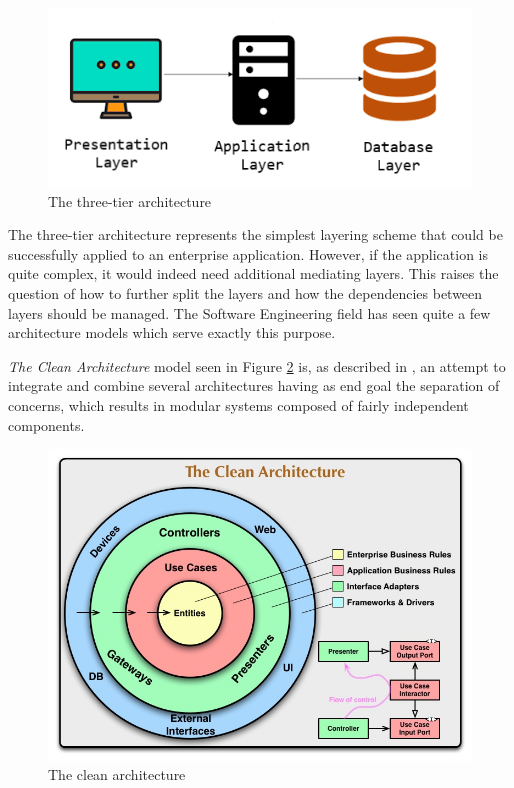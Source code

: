 \begin{figure}[H]
  \centering
  \includegraphics[width=5in]{images/threeTierArchitecture}
  \caption{The three-tier architecture}
  \label{threeTierArchitecture}
\end{figure}

The three-tier architecture represents the simplest layering scheme that could be successfully applied to an enterprise application. However, if the application is quite complex, it would indeed need additional mediating layers. This raises the question of how to further split the layers and how the dependencies between layers should be managed. The Software Engineering field has seen quite a few architecture models which serve exactly this purpose.

\textit{The Clean Architecture} model seen in Figure \ref{cleanArchitectureImg} is, as described in \cite{cleanArchitecture}, an attempt to integrate and combine several architectures having as end goal the separation of concerns, which results in modular systems composed of fairly independent components.

\begin{figure}[H]
  \centering
  \includegraphics[width=5.5in]{images/cleanArchitecture}
  \caption[The clean architecture]{The clean architecture \footnotemark}
  \label{cleanArchitectureImg}
\end{figure}

